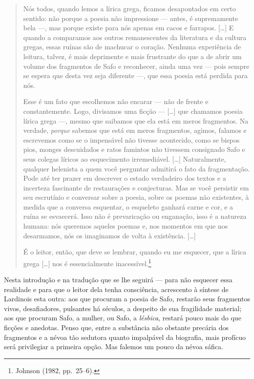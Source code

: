 \begin{quote}
Nós todos, quando lemos a lírica grega, ficamos desapontados em certo sentido:
não porque a poesia não impressione --- antes, é supremamente bela ---, mas
porque existe para nós apenas em cacos e farrapos. [\ldots{}] E quando a comparamos
aos outros remanescentes da literatura e da cultura gregas, essas ruínas são de
machucar o coração. Nenhuma experiência de leitura, talvez, é mais deprimente e
mais frustrante do que a de abrir um volume dos fragmentos de Safo e
reconhecer, ainda uma vez --- pois sempre se espera que desta vez seja diferente
---, que essa poesia está perdida para nós.

Esse é um fato que escolhemos não encarar --- não de frente e constantemente.
Logo, divisamos uma ficção --- [\ldots{}] que chamamos poesia lírica grega ---,
mesmo que saibamos que ela está em meros fragmentos. Na verdade,
\textit{porque} sabemos que está em meros fragmentos, agimos, falamos
e escrevemos como se o impensável não tivesse acontecido, como se bispos pios,
monges descuidados e ratos famintos não tivessem consignado Safo e seus colegas
líricos ao esquecimento irremediável. [\ldots{}] Naturalmente, qualquer helenista a
quem você perguntar admitirá o fato da fragmentação. Pode até ter prazer em
descrever o estado verdadeiro dos textos e a incerteza fascinante de
restaurações e conjecturas. Mas se você persistir em seu escrutínio e conversar
sobre a poesia, sobre os poemas não existentes, à medida que a conversa
esquentar, o esqueleto ganhará carne e cor, e a ruína se esvaecerá. Isso não é
prevaricação ou enganação, isso é a natureza humana: nós queremos aqueles
poemas e, nos momentos em que nos desarmamos, nós os imaginamos de volta à
existência. [\ldots{}]

É o leitor, então, que deve se lembrar, quando eu me esquecer, que a lírica
grega [\ldots{}] nos é essencialmente inacessível.\footnote{ Johnson (1982, pp.~25--6).}
\end{quote}

Nesta introdução e na tradução que se lhe seguirá ---
para não esquecer essa realidade e para que o leitor dela tenha consciência,
acrescento à síntese de Lardinois esta outra: aos que procuram a poesia de
Safo, restarão seus fragmentos vivos, desafiadores, pulsantes há séculos, a
despeito de sua fragilidade material; aos que procuram Safo, a mulher, ou Safo,
a \textit{lésbica}, restará pouco mais do que ficções e anedotas. Penso que,
entre a substância não obstante precária dos fragmentos e a névoa tão sedutora
quanto impalpável da biografia, mais profícuo será privilegiar a primeira
opção. Mas falemos um pouco da névoa sáfica.


